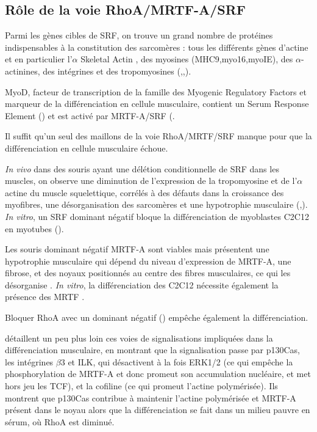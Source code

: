 \subsection{Rôle de la voie RhoA/MRTF-A/SRF}

Parmi les gènes cibles de SRF, on trouve un grand nombre de protéines indispensables à la constitution des sarcomères :  tous les différents gènes d'actine et en particulier l'$\alpha$ Skeletal Actin , des myosines (MHC9,myo16,myoIE), des $\alpha$-actinines, des intégrines et des tropomyosines (\cite{selvaraj_megakaryoblastic_2003},\cite{charvet_new_2006},\cite{esnault_rho-actin_2014}).

MyoD, facteur de transcription de la famille des Myogenic Regulatory Factors et marqueur de la différenciation en cellule musculaire, contient un Serum Response Element (\cite{lhonore_myod_2003}) et est activé par MRTF-A/SRF (\cite{mokalled_mastr_2012}. 

Il suffit qu'un seul des maillons de la voie RhoA/MRTF/SRF manque pour que la différenciation en cellule musculaire échoue. 

\textit{In vivo} dans des souris ayant une délétion conditionnelle de SRF dans les muscles, on observe une diminution de l'expression de la tropomyosine et de l'$\alpha$ actine du muscle squelettique, corrélés à des défauts dans la croissance des myofibres, une désorganisation des sarcomères et une hypotrophie musculaire (\cite{charvet_new_2006},\cite{li_requirement_2005}). \textit{In vitro}, un SRF dominant négatif bloque la différenciation de myoblastes C2C12 en myotubes (\cite{wei_rhoa_1998}).

Les souris dominant négatif MRTF-A sont viables mais présentent une hypotrophie musculaire qui dépend du niveau d'expression de MRTF-A, une fibrose, et des noyaux positionnés au centre des fibres musculaires, ce qui les désorganise \cite{li_requirement_2005}. \textit{In vitro}, la différenciation des C2C12 nécessite également la présence des MRTF \cite{selvaraj_megakaryoblastic_2003}. 

Bloquer RhoA avec un dominant négatif (\cite{wei_rhoa_1998}) empêche également la différenciation.

\cite{kawauchi_p130cas-dependent_2012} détaillent un peu plus loin ces voies de signalisations impliquées dans la différenciation musculaire, en montrant que la signalisation passe par p130Cas, les intégrines $\beta$3 et ILK, qui désactivent à la fois ERK1/2 (ce qui empêche la phosphorylation de MRTF-A et donc promeut son accumulation nucléaire, et met hors jeu les TCF), et la cofiline (ce qui promeut l'actine polymérisée). Ils montrent que p130Cas contribue à maintenir l'actine polymérisée et MRTF-A présent dans le noyau alors que la différenciation se fait dans un milieu pauvre en sérum, où RhoA est diminué. 
 
